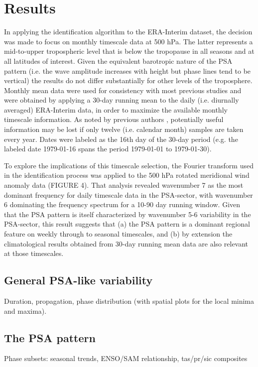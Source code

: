 \section{Results}

In applying the identification algorithm to the ERA-Interim dataset, the decision was made to focus on monthly timescale data at 500 hPa. The latter represents a mid-to-upper tropospheric level that is below the tropopause in all seasons and at all latitudes of interest. Given the equivalent barotropic nature of the PSA pattern (i.e. the wave amplitude increases with height but phase lines tend to be vertical) the results do not differ substantially for other levels of the troposphere. Monthly mean data were used for consistency with most previous studies and were obtained by applying a 30-day running mean to the daily (i.e. diurnally averaged) ERA-Interim data, in order to maximize the available monthly timescale information. As noted by previous authors \citep[e.g.][]{Kidson1988}, potentially useful information may be lost if only twelve (i.e. calendar month) samples are taken every year. Dates were labeled as the 16th day of the 30-day period (e.g. the labeled date 1979-01-16 spans the period 1979-01-01 to 1979-01-30).

To explore the implications of this timescale selection, the Fourier transform used in the identification process was applied to the 500 hPa rotated meridional wind anomaly data (FIGURE 4). That analysis revealed wavenumber 7 as the most dominant frequency for daily timescale data in the PSA-sector, with wavenumber 6 dominating the frequency spectrum for a 10-90 day running window. Given that the PSA pattern is itself characterized by wavenumber 5-6 variability in the PSA-sector, this result suggests that (a) the PSA pattern is a dominant regional feature on weekly through to seasonal timescales, and (b) by extension the climatological results obtained from 30-day running mean data are also relevant at those timescales.

\subsection{General PSA-like variability}

Duration, propagation, phase distribution (with spatial plots for the local minima and maxima).

\subsection{The PSA pattern}

Phase subsets: seasonal trends, ENSO/SAM relationship, tas/pr/sic composites







